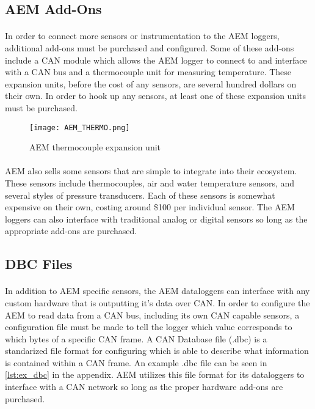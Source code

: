 \subsection{AEM Add-Ons}

\paragraph{}
In order to connect more sensors or instrumentation to the AEM loggers, additional add-ons must be purchased and configured.
Some of these add-ons include a CAN module which allows the AEM logger to connect to and interface with a CAN bus and a thermocouple unit for measuring temperature.
These expansion units, before the cost of any sensors, are several hundred dollars on their own.
In order to hook up any sensors, at least one of these expansion units must be purchased.

\begin{figure}[H]
	\centering
	\texttt{[image: AEM\_THERMO.png]}
	\caption{AEM thermocouple expansion unit}
	\label{fig:AEM_THERMO}
\end{figure}

\paragraph{}
AEM also sells some sensors that are simple to integrate into their ecosystem.
These sensors include thermocouples, air and water temperature sensors, and several styles of pressure transducers.
Each of these sensors is somewhat expensive on their own, costing around \$100 per individual sensor.
The AEM loggers can also interface with traditional analog or digital sensors so long as the appropriate add-ons are purchased.

\subsection{DBC Files}

\paragraph{}
In addition to AEM specific sensors, the AEM dataloggers can interface with any custom hardware that is outputting it's data over CAN.
In order to configure the AEM to read data from a CAN bus, including its own CAN capable sensors, a configuration file must be made to tell the logger which value corresponds to which bytes of a specific CAN frame.
A CAN Database file (.dbc) is a standarized file format for configuring which is able to describe what information is contained within a CAN frame.
An example .dbc file can be seen in \cref{lst:ex_dbc} in the appendix.
AEM utilizes this file format for its dataloggers to interface with a CAN network so long as the proper hardware add-ons are purchased.